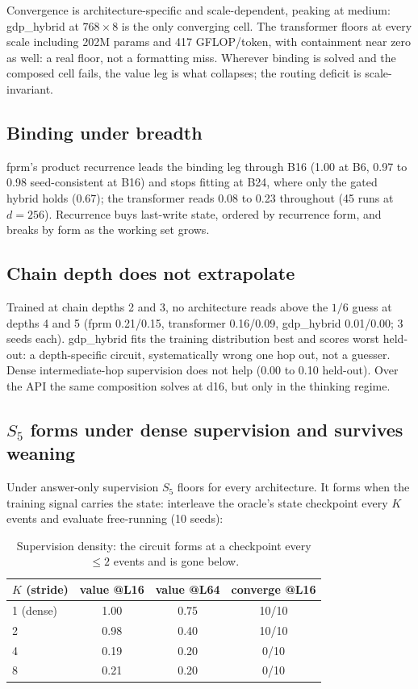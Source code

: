 \documentclass[11pt]{article}
\newcommand{\Sfive}{$S_5$}
\begin{document}
Convergence is architecture-specific and scale-dependent, peaking at medium: gdp\_hybrid at
$768\times8$ is the only converging cell. The transformer floors at every scale including 202M
params and 417 GFLOP/token, with containment near zero as well: a real floor, not a formatting
miss. Wherever binding is solved and the composed cell fails, the value leg is what collapses;
the routing deficit is scale-invariant.

\subsection{Binding under breadth}

fprm's product recurrence leads the binding leg through B16 (1.00 at B6, 0.97 to 0.98
seed-consistent at B16) and stops fitting at B24, where only the gated hybrid holds (0.67);
the transformer reads 0.08 to 0.23 throughout (45 runs at $d=256$). Recurrence buys last-write
state, ordered by recurrence form, and breaks by form as the working set grows.

\subsection{Chain depth does not extrapolate}

Trained at chain depths 2 and 3, no architecture reads above the $1/6$ guess at depths 4 and 5
(fprm 0.21/0.15, transformer 0.16/0.09, gdp\_hybrid 0.01/0.00; 3 seeds each). gdp\_hybrid fits
the training distribution best and scores worst held-out: a depth-specific circuit,
systematically wrong one hop out, not a guesser. Dense intermediate-hop supervision does not
help (0.00 to 0.10 held-out). Over the API the same composition solves at d16, but only in the thinking regime.

\subsection{\Sfive{} forms under dense supervision and survives weaning}

Under answer-only supervision \Sfive{} floors for every architecture. It forms when the
training signal carries the state: interleave the oracle's state checkpoint every $K$ events
and evaluate free-running (10 seeds):

\begin{table}[h]
\centering
\begin{tabular}{lccc}
\toprule
$K$ (stride) & value @L16 & value @L64 & converge @L16 \\
\midrule
1 (dense) & 1.00 & 0.75 & 10/10 \\
2 & 0.98 & 0.40 & 10/10 \\
4 & 0.19 & 0.20 & 0/10 \\
8 & 0.21 & 0.20 & 0/10 \\
\bottomrule
\end{tabular}
\caption{Supervision density: the circuit forms at a checkpoint every $\le 2$ events and is
gone below.}
\label{tab:density}
\end{table}
\end{document}
